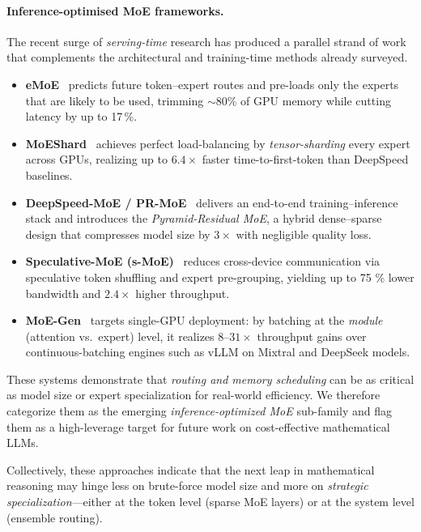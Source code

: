 \documentclass[acmsmall,anonymous]{acmart}
\begin{document}
\paragraph{Inference-optimised MoE frameworks.}
The recent surge of \emph{serving-time} research has produced a parallel strand of work that complements the architectural and training-time methods already surveyed.  
\begin{itemize}
  \item \textbf{eMoE}~\cite{tairin2025emoe} predicts future token–expert routes and pre-loads only the experts that are likely to be used, trimming \mbox{$\sim$80\%} of GPU memory while cutting latency by up to 17\,\%.  
  \item \textbf{MoEShard}~\cite{balmau2025moeshard} achieves perfect load-balancing by \emph{tensor-sharding} every expert across GPUs, realizing up to $6.4\times$ faster time-to-first-token than DeepSpeed baselines.  
  \item \textbf{DeepSpeed-MoE / PR-MoE}~\cite{rajbhandari2022deepspeedmoe} delivers an end-to-end training–inference stack and introduces the \emph{Pyramid-Residual MoE}, a hybrid dense–sparse design that compresses model size by $3\times$ with negligible quality loss.  
  \item \textbf{Speculative-MoE (s-MoE)}~\cite{li2025speculativemoe} reduces cross-device communication via speculative token shuffling and expert pre-grouping, yielding up to 75 \% lower bandwidth and $2.4\times$ higher throughput.  
  \item \textbf{MoE-Gen}~\cite{xu2025moegen} targets single-GPU deployment: by batching at the \emph{module} (attention vs.\ expert) level, it realizes $8$–$31\times$ throughput gains over continuous-batching engines such as vLLM on Mixtral and DeepSeek models.  
\end{itemize}

\noindent
These systems demonstrate that \emph{routing and memory scheduling} can be as critical as model size or expert specialization for real-world efficiency.  We therefore categorize them as the emerging \emph{inference-optimized MoE} sub-family and flag them as a high-leverage target for future work on cost-effective mathematical LLMs.%

Collectively, these approaches indicate that the next leap in
mathematical reasoning may hinge less on brute-force model size and more
on \emph{strategic specialization}—either at the token level (sparse MoE
layers) or at the system level (ensemble routing).
\end{document}
